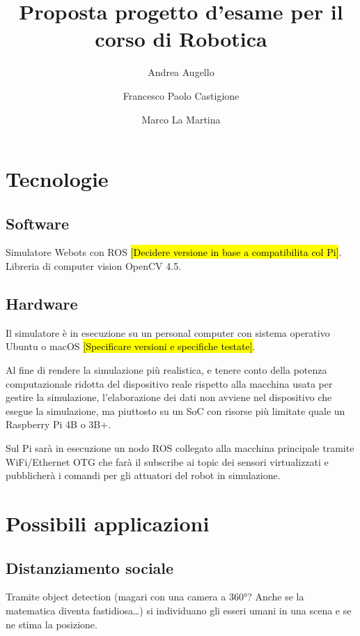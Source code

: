 \documentclass[a4paper]{article}
\begin{document}
	\title{Proposta progetto d'esame per il corso di Robotica}
	\author{Andrea Augello \and Francesco Paolo Castigione \and Marco La Martina}
	\maketitle
	
	\section{Tecnologie}\label{sec:Tecnologie}
	\subsection{Software}\label{subsec:Software}
	Simulatore Webots con ROS \hl{[Decidere versione in base a compatibilita col Pi]}. Libreria di computer vision OpenCV 4.5.
	\subsection{Hardware}\label{subsec:Hardware}
	Il simulatore è in esecuzione su un personal computer con sistema operativo Ubuntu o macOS \hl{[Specificare versioni e specifiche testate]}.

	Al fine di rendere la simulazione più realistica, e tenere conto della potenza computazionale ridotta del dispositivo reale rispetto alla macchina usata per gestire la simulazione, l'elaborazione dei dati non avviene nel dispositivo che esegue la simulazione, ma piuttosto su un SoC con risorse più limitate quale un Raspberry Pi 4B o 3B+.

	Sul Pi sarà in esecuzione un nodo ROS collegato alla macchina principale tramite WiFi/Ethernet OTG che farà il subscribe ai topic dei sensori virtualizzati e pubblicherà i comandi per gli attuatori del robot in simulazione.

	\section{Possibili applicazioni}\label{sec:Possibili-applicazioni}
	\subsection{Distanziamento sociale}\label{subsec:Distanziamento-sociale}
	Tramite object detection (magari con una camera a 360°? Anche se la matematica diventa fastidiosa\ldots) si individuano gli esseri umani in una scena e se ne stima la posizione.
\end{document}
